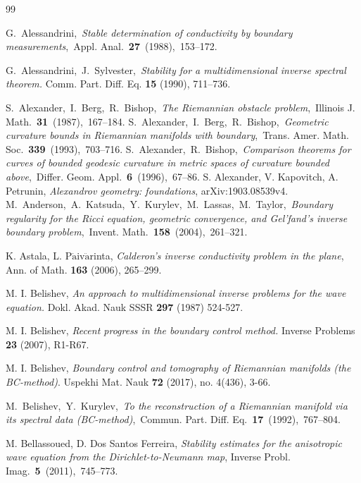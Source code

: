 \documentclass[11pt,letterpaper]{amsart}
\numberwithin{equation}{section}
\theoremstyle{definition}
\theoremstyle{plain}
\theoremstyle{definition}
\theoremstyle{plain}
\theoremstyle{definition}
\theoremstyle{plain}
\begin{document}
\begin{thebibliography}{99}

 G.~Alessandrini,~\emph{Stable determination of conductivity by boundary measurements},~Appl. Anal.~\textbf{27}~(1988),~153--172.

G.~Alessandrini,~J.~Sylvester,~\emph{Stability for a multidimensional inverse spectral theorem.}
Comm. Part. Diff. Eq. {\bf 15} (1990),  711--736.

 S.~Alexander,~I.~Berg,~R.~Bishop,~\emph{The Riemannian obstacle problem},~Illinois J. Math.~\textbf{31}~(1987),~167--184.
 S.~Alexander,~I.~Berg,~R.~Bishop,~\emph{Geometric curvature bounds in Riemannian manifolds with boundary},~Trans. Amer. Math. Soc.~\textbf{339}~(1993),~703--716.
 S.~Alexander,~R.~Bishop,~\emph{Comparison theorems for curves of bounded geodesic curvature in metric spaces of curvature bounded above},~Differ. Geom. Appl.~\textbf{6}~(1996),~67--86.
 S. Alexander, V. Kapovitch, A. Petrunin, \emph{Alexandrov geometry: foundations}, arXiv:1903.08539v4.
 M.~Anderson,~A.~Katsuda,~Y.~Kurylev,~M.~Lassas,~M.~Taylor,~\emph{Boundary regularity for the Ricci equation, geometric convergence, and Gel'fand's inverse boundary problem},~Invent. Math.~\textbf{158}~(2004),~261--321.

K. Astala, L. P$\ddot{\textrm{a}}$iv$\ddot{\textrm{a}}$rinta, \emph{Calderon's inverse conductivity problem in the plane}, Ann. of Math. {\bf 163} (2006), 265--299.

M. I. Belishev, \emph{An approach to multidimensional inverse problems for the wave equation.}  Dokl. Akad. Nauk SSSR {\bf 297} (1987) 524-527.

M. I. Belishev, \emph{Recent progress in the boundary control method.} Inverse Problems {\bf 23} (2007), R1-R67.

M. I. Belishev, \emph{
Boundary control and tomography of Riemannian manifolds (the BC-method)}. Uspekhi Mat. Nauk {\bf 72} (2017), no. 4(436), 3-66.

 M.~Belishev,~Y.~Kurylev,~\emph{To the reconstruction of a Riemannian manifold via its spectral data (BC-method)},~Commun. Part. Diff. Eq.~\textbf{17}~(1992),~767--804.

M. Bellassoued, D. Dos Santos Ferreira, \emph{Stability estimates for the anisotropic wave equation from the Dirichlet-to-Neumann map}, Inverse Probl. Imag.~\textbf{5}~(2011),~745--773.




\end{thebibliography}
\end{document}
